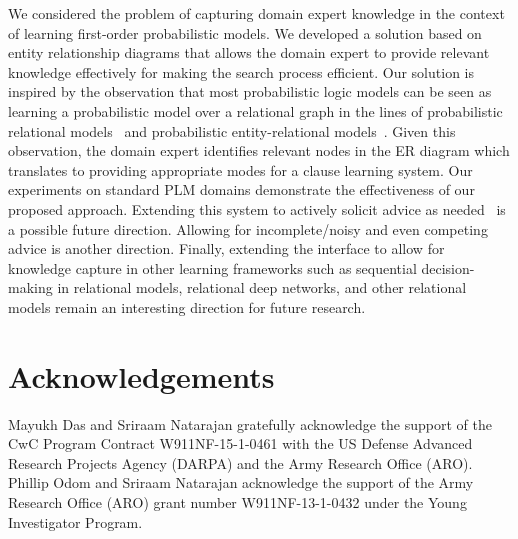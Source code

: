 \documentclass[sigconf]{acmart}
\begin{document}
We considered the problem of capturing domain expert knowledge in the context of learning first-order probabilistic models. We developed a solution based on entity relationship diagrams that allows the domain expert to provide relevant knowledge effectively for making the search process efficient. Our solution is inspired by the observation that most  probabilistic logic models can be seen as learning a probabilistic model over a relational graph in the lines of probabilistic relational models~\cite{prm}
and probabilistic entity-relational models~\cite{daper}. Given this observation, the domain expert identifies relevant nodes in the ER diagram which translates to providing appropriate modes for a clause learning system. Our experiments on standard PLM domains demonstrate the effectiveness of our proposed approach.
Extending this system to actively solicit advice as needed~\cite{odom2016ECML} is a possible future direction. Allowing for incomplete/noisy and even competing advice is another direction. Finally, extending the interface to allow for knowledge capture in other learning frameworks such as sequential decision-making in relational models, relational deep networks, and other relational models remain an interesting direction for future research.

\section*{Acknowledgements}
Mayukh Das and Sriraam Natarajan gratefully acknowledge the support of the CwC Program Contract W911NF-15-1-0461 with the US Defense Advanced Research Projects Agency (DARPA) and the Army Research Office (ARO).
Phillip Odom and Sriraam Natarajan acknowledge the support of the Army Research Office (ARO) grant number W911NF-13-1-0432 under the Young Investigator Program.



\end{document}
